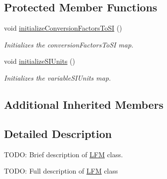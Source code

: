 \subsection*{Protected Member Functions}
\begin{DoxyCompactItemize}
\item 
void \hyperlink{classccmc_1_1_l_f_m_a575ca8f71a149babc45fe840fbf66daf}{initialize\-Conversion\-Factors\-To\-S\-I} ()
\begin{DoxyCompactList}\small\item\em Initializes the conversion\-Factors\-To\-S\-I map.  \end{DoxyCompactList}\item 
void \hyperlink{classccmc_1_1_l_f_m_ab82dc1add65cfa4c40bff916129c4a41}{initialize\-S\-I\-Units} ()
\begin{DoxyCompactList}\small\item\em Initializes the variable\-S\-I\-Units map.  \end{DoxyCompactList}\end{DoxyCompactItemize}
\subsection*{Additional Inherited Members}


\subsection{Detailed Description}
T\-O\-D\-O\-: Brief description of \hyperlink{classccmc_1_1_l_f_m}{L\-F\-M} class. 

T\-O\-D\-O\-: Full description of \hyperlink{classccmc_1_1_l_f_m}{L\-F\-M} class 

